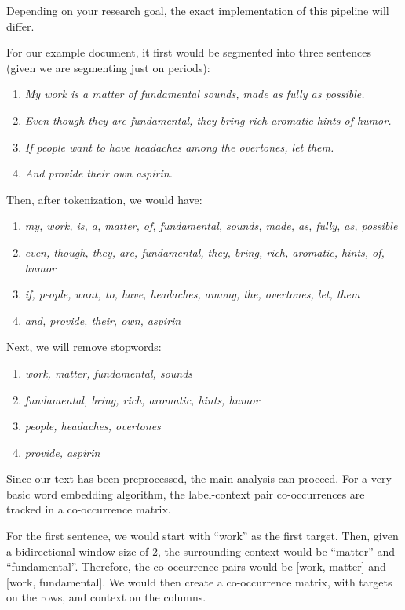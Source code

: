 Depending on your research goal, the exact implementation of this pipeline will differ.

For our example document, it first would be segmented into three sentences (given we are segmenting just on periods):

\begin{enumerate}
    \item \textit{My work is a matter of fundamental sounds, made as fully as possible.}
    \item \textit{Even though they are fundamental, they bring rich aromatic hints of humor.}
    \item \textit{If people want to have headaches among the overtones, let them.}
    \item \textit{And provide their own aspirin.}
\end{enumerate}

Then, after tokenization, we would have:

\begin{enumerate}
    \item \textit{my, work, is, a, matter, of, fundamental, sounds, made, as, fully, as, possible}
    \item \textit{even, though, they, are, fundamental, they, bring, rich, aromatic, hints, of, humor}
    \item \textit{if, people, want, to, have, headaches, among, the, overtones, let, them}
    \item \textit{and, provide, their, own, aspirin}
\end{enumerate}

Next, we will remove stopwords:

\begin{enumerate}
    \item \textit{work, matter, fundamental, sounds}
    \item \textit{fundamental, bring, rich, aromatic, hints, humor}
    \item \textit{people, headaches, overtones}
    \item \textit{provide, aspirin}
\end{enumerate}

Since our text has been preprocessed, the main analysis can proceed. For a very basic word embedding algorithm, the label-context pair co-occurrences are tracked in a co-occurrence matrix.

For the first sentence, we would start with ``work'' as the first target. Then, given a bidirectional window size of 2, the surrounding context would be ``matter'' and ``fundamental''. Therefore, the co-occurrence pairs would be [work, matter] and [work, fundamental]. We would then create a co-occurrence matrix, with targets on the rows, and context on the columns. 

